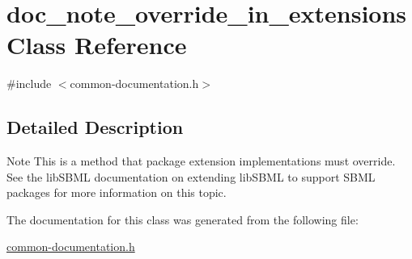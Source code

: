 \hypertarget{classdoc__note__override__in__extensions}{}\section{doc\+\_\+note\+\_\+override\+\_\+in\+\_\+extensions Class Reference}
\label{classdoc__note__override__in__extensions}


{\ttfamily \#include $<$common-\/documentation.\+h$>$}



\subsection{Detailed Description}
\begin{DoxyNote}{Note}
This is a method that package extension implementations must override. See the lib\+S\+B\+ML documentation on extending lib\+S\+B\+ML to support S\+B\+ML packages for more information on this topic. 
\end{DoxyNote}


The documentation for this class was generated from the following file\+:\begin{DoxyCompactItemize}
\item 
\hyperlink{common-documentation_8h}{common-\/documentation.\+h}\end{DoxyCompactItemize}
